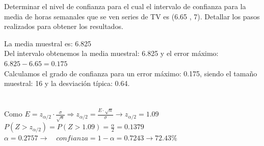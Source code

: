 \documentclass[spanish, 11pt]{exam}
\begin{document}
\begin{questions}
Determinar el nivel de confianza para el cual el intervalo de confianza para la media de
horas semanales que se ven series de TV es (6.65 , 7). Detallar los pasos realizados para obtener los resultados. \begin{solution}   La media muestral es: 6.825 \\ Del intervalo obtenemos la media muestral: 6.825 y el error máximo: $6.825-6.65=0.175$ \\ Calculamos el grado de confianza para un error máximo: 0.175, siendo el tamaño muestral: 16 y la desviación típica: 0.64. \\ \\  \\ Como $E=z_{\alpha / 2}\cdot \frac{\sigma}{\sqrt{n}} \Rightarrow z_{\alpha / 2} =\frac{E \cdot \sqrt{n}}{\sigma}\to z_{\alpha / 2}=1.09$ \\ $P(Z>z_{\alpha / 2})=P(Z>1.09)=\frac{\alpha}{2}=0.1379$ \\ $\alpha=0.2757 \to \quad confianza=1 - \alpha=0.7243 \to 72.43 \%$    \end{solution}
    \end{questions}
    
\end{document}
